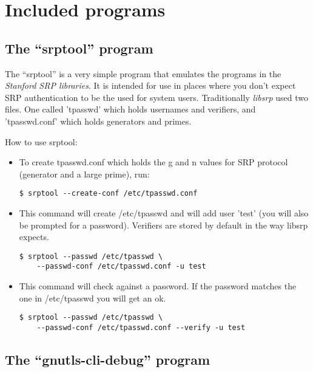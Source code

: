 \chapter{Included programs}

\section{The ``srptool'' program}
\label{srptool}

The ``srptool'' is a very simple program that emulates the programs in the 
\emph{Stanford SRP libraries}.
It is intended for use in places where you don't expect SRP
authentication to be the used for system users.
Traditionally \emph{libsrp} used two files. One called 'tpasswd' which holds usernames 
and verifiers, and 'tpasswd.conf' which holds generators and primes.
\par
How to use srptool:

\begin{itemize}


\item To create tpasswd.conf which holds the g and n values for
SRP protocol (generator and a large prime), run:
\begin{verbatim}
$ srptool --create-conf /etc/tpasswd.conf
\end{verbatim}


\item This command will create /etc/tpasswd and will add user 'test' (you will also
be prompted for a password). Verifiers are stored by default in the
way libsrp expects.
\begin{verbatim}
$ srptool --passwd /etc/tpasswd \ 
    --passwd-conf /etc/tpasswd.conf -u test
\end{verbatim}

\item This command will check against a password. If the password matches 
the one in /etc/tpasswd you will get an ok.
\begin{verbatim}
$ srptool --passwd /etc/tpasswd \ 
    --passwd-conf /etc/tpasswd.conf --verify -u test
\end{verbatim}

\end{itemize}



\section{The ``gnutls-cli-debug'' program}

